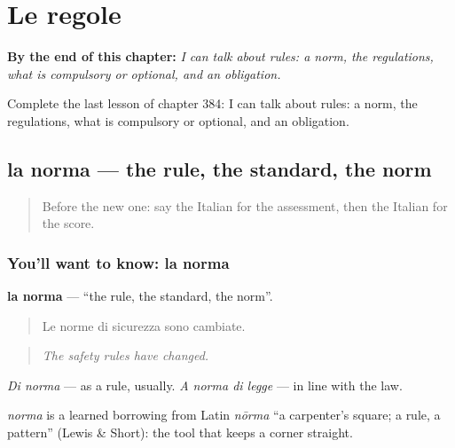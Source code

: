 
\chapter{Le regole}
\label{ch:it-le-regole}

\begin{chapteropening}
\textbf{By the end of this chapter:} \emph{I can talk about rules: a norm, the regulations, what is compulsory or optional, and an obligation.}

Complete the last lesson of chapter 384: I can talk about rules: a norm, the regulations, what is compulsory or optional, and an obligation.
\end{chapteropening}

\section[la norma]{la norma — the rule, the standard, the norm}

\label{lesson:IT-C384-norma}



\begin{quote}
Before the new one: say the Italian for the assessment, then the Italian for the score.
\end{quote}

\subsection*{You'll want to know: la norma}
\textbf{la norma} — \textquotedblleft{}the rule, the standard, the norm\textquotedblright{}.

\begin{quote}
Le norme di sicurezza sono cambiate.
\end{quote}

\begin{quote}
\emph{The safety rules have changed.}
\end{quote}

\emph{Di norma} — as a rule, usually. \emph{A norma di legge} — in line with the law.

\begin{cousinweb}
\emph{norma} is a learned borrowing from Latin \emph{nōrma} \textquotedblleft{}a carpenter's square; a rule, a pattern\textquotedblright{} (Lewis \& Short): the tool that keeps a corner straight.
\end{cousinweb}


